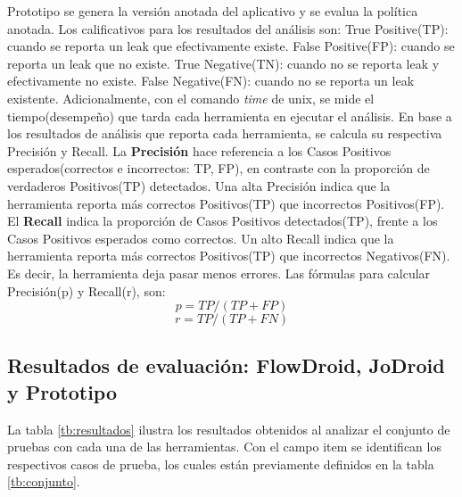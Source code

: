 Prototipo se genera la versión anotada del aplicativo y se evalua la política
anotada.\newline
Los calificativos para los resultados del análisis son:  
True Positive(TP): cuando se reporta un leak que efectivamente existe. 
False Positive(FP): cuando se reporta un leak que no existe.  
True Negative(TN): cuando no se reporta leak y efectivamente no existe. 
False Negative(FN): cuando no se reporta un leak existente.\newline
Adicionalmente, con el comando \textit{time}\cite{time-man} de unix, se mide el
tiempo(desempeño) que tarda cada herramienta en ejecutar el análisis.\newline
En base a los resultados de análisis que reporta cada herramienta, se
calcula su respectiva Precisión y Recall.\newline
La \textbf{Precisión} hace referencia a los Casos Positivos esperados(correctos
e incorrectos: TP, FP), en contraste con la proporción de verdaderos Positivos(TP)
detectados\cite{Precision-Recall}. Una alta Precisión indica que la herramienta
reporta más correctos Positivos(TP) que incorrectos Positivos(FP).\newline 
El \textbf{Recall} indica la proporción de Casos Positivos detectados(TP),
frente a los Casos Positivos esperados como correctos\cite{Precision-Recall}. Un
alto Recall indica que la herramienta reporta más correctos Positivos(TP) que incorrectos
Negativos(FN). Es decir, la herramienta deja pasar menos errores.\newline
Las fórmulas para calcular Precisión(p) y Recall(r), son:
\begin{equation}
\label{pre}
	p = TP/(TP +FP) 
\end{equation}
\begin{equation}
\label{rec}
	r = TP/(TP+FN)
\end{equation}

\subsection{Resultados de evaluación: FlowDroid, JoDroid y Prototipo}
La tabla \ref{tb:resultados} ilustra los resultados obtenidos al analizar el
conjunto de pruebas con cada una de las herramientas. Con el campo item se
identifican los respectivos casos de prueba, los cuales están
previamente definidos en la tabla \ref{tb:conjunto}.

